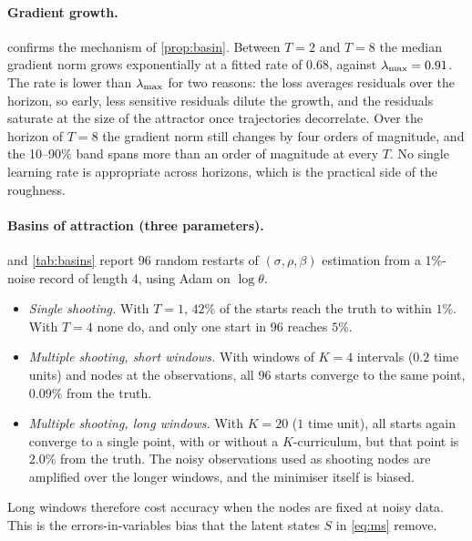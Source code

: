 \paragraph{Gradient growth.}  confirms the mechanism of \cref{prop:basin}. Between $T=2$ and $T=8$ the median gradient norm grows exponentially at a fitted rate of $0.68$, against $\lambda_{\max}=0.91$. The rate is lower than $\lambda_{\max}$ for two reasons: the loss averages residuals over the horizon, so early, less sensitive residuals dilute the growth, and the residuals saturate at the size of the attractor once trajectories decorrelate. Over the horizon of $T=8$ the gradient norm still changes by four orders of magnitude, and the 10--90\% band spans more than an order of magnitude at every $T$. No single learning rate is appropriate across horizons, which is the practical side of the roughness.

\paragraph{Basins of attraction (three parameters).}  and \cref{tab:basins} report 96 random restarts of $(\sigma,\rho,\beta)$ estimation from a 1\%-noise record of length 4, using Adam on $\log\theta$.
\begin{itemize}
  \item \emph{Single shooting.} With $T=1$, $42\%$ of the starts reach the truth to within $1\%$. With $T=4$ none do, and only one start in 96 reaches $5\%$.
  \item \emph{Multiple shooting, short windows.} With windows of $K=4$ intervals ($0.2$ time units) and nodes at the observations, all 96 starts converge to the same point, $0.09\%$ from the truth.
  \item \emph{Multiple shooting, long windows.} With $K=20$ ($1$ time unit), all starts again converge to a single point, with or without a $K$-curriculum, but that point is $2.0\%$ from the truth. The noisy observations used as shooting nodes are amplified over the longer windows, and the minimiser itself is biased.
\end{itemize}
Long windows therefore cost accuracy when the nodes are fixed at noisy data. This is the errors-in-variables bias that the latent states $S$ in \eqref{eq:ms} remove.

